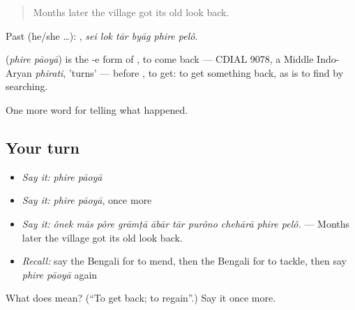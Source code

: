 \begin{quote}
Months later the village got its old look back.
\end{quote}

Past (he/she …):      , \emph{sei lok tār byāg phire pelô}.

\begin{cousinweb}
\textbf{ } (\emph{phire pāoyā}) is the -e form of \textbf{}, to come back — CDIAL 9078, a Middle Indo-Aryan \emph{phirati}, 'turns' — before \textbf{}, to get: to get something back, as \textbf{ } is to find by searching.
\end{cousinweb}

\begin{grammarlens}[title={What you've built}]
One more word for telling what happened.
\end{grammarlens}

\subsection*{Your turn}
\begin{itemize}
\raggedright
  \item \emph{Say it:} \emph{phire pāoyā}
  \item \emph{Say it:} \emph{phire pāoyā}, once more
  \item \emph{Say it:} \emph{ônek mās pôre grāmṭā ābār tār purôno chehārā phire pelô.} — Months later the village got its old look back.
  \item \emph{Recall:} say the Bengali for to mend, then the Bengali for to tackle, then say \emph{phire pāoyā} again
\end{itemize}

\begin{tcolorbox}[breakable,colback=teal!4,colframe=teal!35!black,title={Before you move on}]
What does   mean? (\textquotedblleft{}To get back; to regain\textquotedblright{}.) Say it once more.
\end{tcolorbox}
